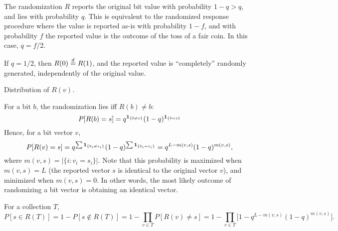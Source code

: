 \documentclass[11pt,draft]{article}
\begin{document}
\begin{rmk}
The randomization $R$ reports the original bit value with probability $1-q > q$, and lies with probability $q$.
This is equivalent to the randomized response procedure where the value is reported as-is with probability $1-f$, and with probability $f$ the reported value is the outcome of the toss of a fair coin.
In this case, $q = f/2$.
\end{rmk}
\begin{rmk}
If $q = 1/2$, then $R(0)\stackrel{d}{=} R(1)$, and the reported value is ``completely'' randomly generated, \ie independently of the original value.
\end{rmk}

Distribution of $R(v)$.

For a bit $b$, the randomization lies iff $R(b) \neq b$: 
\[
    P[R(b) = s] = q^{\operatorname{\mathbf{1}}_{\{b \neq s\}}}(1-q)^{\operatorname{\mathbf{1}}_{\{b = s\}}}
\]
Hence, for a bit vector $v$, 
\[ P[R(v) = s] = q^{\sum\operatorname{\mathbf{1}}_{\{b_i \neq s_i\}}}(1-q)^{\sum\operatorname{\mathbf{1}}_{\{b_i = s_i\}}} 
    = q^{L-m(v,s)}(1-q)^{m(v,s)}, \]
where $m(v,s) = |\{i: v_i = s_i\}|$. 
Note that this probability is maximized when $m(v,s) = L$ (the reported vector $s$ is identical to the original vector $v$), and minimized when $m(v,s) = 0$.
In other words, the most likely outcome of randomizing a bit vector is obtaining an identical vector.

For a collection $T$,
\[ 
    P[s \in R(T)] = 1-P[s \not\in R(T)] = 1-\prod_{v \in T} P[R(v) \neq s]
    = 1-\prod_{v \in T} \big[1 - q^{L-m(v,s)}(1-q)^{m(v,s)} \big].
\]
\end{document}
